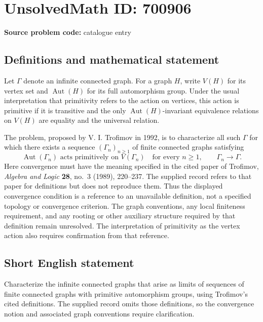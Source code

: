 \documentclass[11pt]{article}
\begin{document}
\section*{UnsolvedMath ID: 700906}
\textbf{Source problem code:} catalogue entry
\subsection{Definitions and mathematical statement}
Let \(\Gamma\) denote an infinite connected graph. For a graph \(H\), write \(V(H)\) for its vertex set and \(\operatorname{Aut}(H)\) for its full automorphism group. Under the usual interpretation that primitivity refers to the action on vertices, this action is primitive if it is transitive and the only \(\operatorname{Aut}(H)\)-invariant equivalence relations on \(V(H)\) are equality and the universal relation.

The problem, proposed by V. I. Trofimov in 1992, is to characterize all such \(\Gamma\) for which there exists a sequence \((\Gamma_n)_{n\geq 1}\) of finite connected graphs satisfying
\[
\operatorname{Aut}(\Gamma_n)\text{ acts primitively on }V(\Gamma_n)
\quad\text{for every }n\geq 1,
\qquad
\Gamma_n\longrightarrow\Gamma.
\]
Here convergence must have the meaning specified in the cited paper of Trofimov, \emph{Algebra and Logic} \textbf{28}, no.~3 (1989), 220--237. The supplied record refers to that paper for definitions but does not reproduce them. Thus the displayed convergence condition is a reference to an unavailable definition, not a specified topology or convergence criterion. The graph conventions, any local finiteness requirement, and any rooting or other auxiliary structure required by that definition remain unresolved. The interpretation of primitivity as the vertex action also requires confirmation from that reference.
\subsection{Short English statement}
Characterize the infinite connected graphs that arise as limits of sequences of finite connected graphs with primitive automorphism groups, using Trofimov's cited definitions. The supplied record omits those definitions, so the convergence notion and associated graph conventions require clarification.
\end{document}
